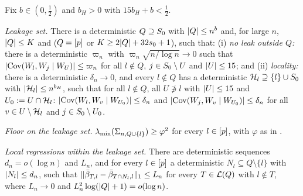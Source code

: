Fix $b\in(0,\tfrac12)$ and $b_H>0$ with $15b_H+b<\tfrac12$.
\Astate
\begin{localassumption}\label{asm:reported}
\begin{asmitems}
  \item\label{asm:rr-leak} \emph{Leakage set.} There is a deterministic $Q\supseteq S_0$ with $\lvert Q\rvert\le n^b$ and, for
    large $n$, $\lvert Q\rvert\le K$ and ($Q=[p]$ or $K\ge2\lvert Q\rvert+32s_0+1$), such that: (i) \emph{no leak outside $Q$:}
    there is a deterministic $\varpi_n$ with $\varpi_n\sqrt{n/\log n}\to0$ such that
    $\lvert \operatorname{Cov}(W_l,W_j\mid W_U)\rvert\le\varpi_n$ for all $l\notin Q$, $j\in S_0\setminus U$ and $\lvert U\rvert\le15$; and (ii)
    \emph{locality:} there is a deterministic $\delta_n\to0$, and every $l\notin Q$ has a deterministic
    $\mathcal H_l\supseteq\{l\}\cup S_0$ with $\lvert \mathcal H_l\rvert\le n^{b_H}$, such that for all $l\notin Q$, all $U\not\ni l$ with
    $\lvert U\rvert\le15$ and $U_0:=U\cap\mathcal H_l$: $\lvert \operatorname{Cov}(W_l,W_v\mid W_{U_0})\rvert\le\delta_n$ and
    $\lvert \operatorname{Cov}(W_j,W_v\mid W_{U_0})\rvert\le\delta_n$ for all $v\in U\setminus\mathcal H_l$ and $j\in S_0\setminus U_0$.
  \item\label{asm:rr-floor} \emph{Floor on the leakage set.} $\lambda_{\min}(\Sigma_{n,Q\cup\{l\}})\ge\varphi^2$ for every
    $l\in[p]$, with $\varphi$ as in .
  \item\label{asm:rr-local} \emph{Local regressions within the leakage set.} There are deterministic sequences
    $d_n=o(\log n)$ and $L_n$, and for every $l\in[p]$ a deterministic $N_l\subseteq Q\setminus\{l\}$ with
    $\lvert N_l\rvert\le d_n$, such that $\lVert \bar\beta_{T,l}-\bar\beta_{T\cap N_l,l}\rVert_1\le L_n$ for every $T\in\mathcal L(Q)$ with
    $l\notin T$, where $L_n\to0$ and $L_n^2\log(\lvert Q\rvert+1)=o(\log n)$.
\end{asmitems}
\end{localassumption}
